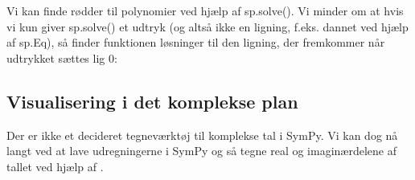 \documentclass[letterpaper,10pt,english]{jupyterBook}
\begin{document}
\noindent{}

\noindent{}

\noindent{}

\noindent{}

Vi kan finde rødder til polynomier ved hjælp af sp.solve(). Vi minder om at hvis vi kun giver sp.solve() et udtryk (og altså ikke en ligning, f.eks. dannet ved hjælp af sp.Eq), så finder funktionen løsninger til den ligning, der fremkommer når udtrykket sættes lig 0:

\begin{sphinxVerbatim}[commandchars=\\\{\}]
    
               


  
\end{sphinxVerbatim}

\noindent{}

\noindent{}


\subsection{Visualisering i det komplekse plan}
\label{\detokenize{notebooks/sympy/Notebook_kompleks:visualisering-i-det-komplekse-plan}}
Der er ikke et decideret tegneværktøj til komplekse tal i SymPy. Vi kan dog nå langt ved at lave udregningerne i SymPy og så tegne real\sphinxhyphen{} og imaginærdelene af tallet ved hjælp af .
\end{document}
